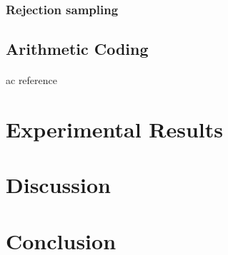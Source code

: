 \documentclass{article}
\begin{document}
\paragraph{}
\cite{havasi2018minimal}

\subsubsection{Rejection sampling}
\paragraph{}
\cite{harsha2007communication}

\subsection{Arithmetic Coding}
\paragraph{}
ac reference \cite{rissanen1981universal}

\section{Experimental Results}

\cite{zhao2015loss}
\section{Discussion}
\section{Conclusion}

\printbibliography
\end{document}
